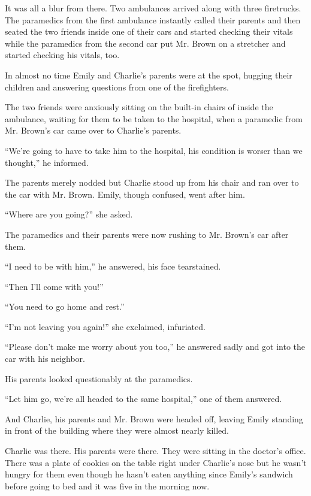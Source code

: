 It was all a blur from there. Two ambulances arrived along with three firetrucks. The   paramedics from the first ambulance instantly called their parents and then seated the two friends inside one of their cars and started checking their vitals while the paramedics from the second car put Mr. Brown on a stretcher and started checking his vitals, too.

In almost no time Emily and Charlie's parents were at the spot, hugging their children and answering questions from one of the firefighters.

The two friends were anxiously sitting on the built-in chairs of inside the ambulance, waiting for them to be taken to the hospital, when a paramedic from Mr. Brown's car came over to Charlie's parents.

“We're going to have to take him to the hospital, his condition is worser than we thought,” he informed.

The parents merely nodded but Charlie stood up from his chair and ran over to the car with Mr. Brown. Emily, though confused, went after him.

“Where are you going?” she asked.

The paramedics and their parents were now rushing to Mr. Brown's car after them.

“I need to be with him,” he answered, his face tearstained.

“Then I'll come with you!”

“You need to go home and rest.”

“I'm not leaving you again!” she exclaimed, infuriated.

“Please don't make me worry about you too,” he answered sadly and got into the car with his neighbor.

His parents looked questionably at the paramedics.

“Let him go, we're all headed to the same hospital,” one of them answered.

And Charlie, his parents and Mr. Brown were headed off, leaving Emily standing in front of the building where they were almost nearly killed.

\bigskip

Charlie was there. His parents were there. They were sitting in the doctor's office. There was a plate of cookies on the table right under Charlie's nose but he wasn't hungry for them even though he hasn't eaten anything since Emily's sandwich before going to bed and it was five in the morning now.

